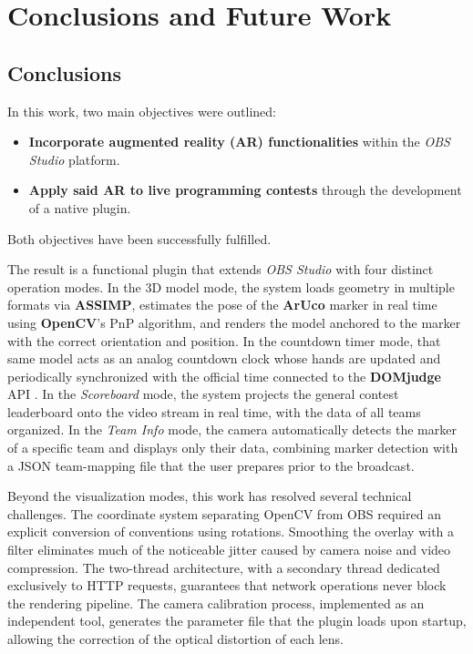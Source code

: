 \chapter{Conclusions and Future Work}
\label{cap:conclusiones}


\section{Conclusions}

In this work, two main objectives were outlined:

\begin{itemize}
    \item \textbf{Incorporate augmented reality (AR) functionalities} within the \textit{OBS Studio} platform.
    \item \textbf{Apply said AR to live programming contests} through the development of a native plugin.
\end{itemize}

Both objectives have been successfully fulfilled.

The result is a functional plugin that extends \textit{OBS Studio} with four distinct operation modes. In the 3D model mode, the system loads geometry in multiple formats via \textbf{ASSIMP}, estimates the pose of the \textbf{ArUco} marker in real time using \textbf{OpenCV}'s PnP algorithm, and renders the model anchored to the marker with the correct orientation and position. In the countdown timer mode, that same model acts as an analog countdown clock whose hands are updated and periodically synchronized with the official time connected to the \textbf{DOMjudge} API \citep{DOMjudge}. In the \textit{Scoreboard} mode, the system projects the general contest leaderboard onto the video stream in real time, with the data of all teams organized. In the \textit{Team Info} mode, the camera automatically detects the marker of a specific team and displays only their data, combining marker detection with a JSON team-mapping file that the user prepares prior to the broadcast.

Beyond the visualization modes, this work has resolved several technical challenges. The coordinate system separating OpenCV from OBS required an explicit conversion of conventions using rotations. Smoothing the overlay with a filter eliminates much of the noticeable jitter caused by camera noise and video compression. The two-thread architecture, with a secondary thread dedicated exclusively to HTTP requests, guarantees that network operations never block the rendering pipeline. The camera calibration process, implemented as an independent tool, generates the parameter file that the plugin loads upon startup, allowing the correction of the optical distortion of each lens.

